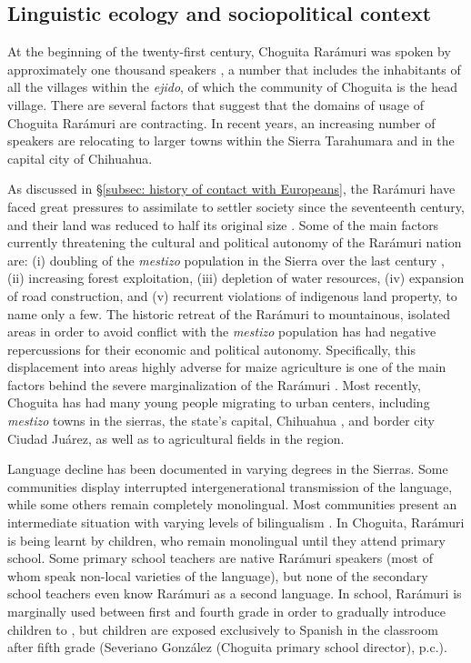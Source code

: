 \subsection{Linguistic ecology and sociopolitical context}
\label{subsec: linguistic ecology and socioolitical context}

At the beginning of the twenty-first century, Choguita Rarámuri was spoken by approximately one thousand speakers \citep{casaus2008quantitative}, a number that includes the inhabitants of all the villages within the \textit{ejido}, of which the community of Choguita is the head village. There are several factors that suggest that the domains of usage of Choguita Rarámuri are contracting. In recent years, an increasing number of speakers are relocating to larger towns within the Sierra Tarahumara and in the capital city of Chihuahua.

As discussed in §\ref{subsec: history of contact with Europeans}, the Rarámuri have faced great pressures to assimilate to settler society since the seventeenth century, and their land was reduced to half its original size \citep{paciotto1996tarahumara}. Some of the main factors currently threatening the cultural and political autonomy of the Rarámuri nation are: (i) doubling of the \textit{mestizo} population in the Sierra over the last century \citep{merrill2013genetic}, (ii) increasing forest exploitation, (iii) depletion of water resources, (iv) expansion of road construction, and (v) recurrent violations of indigenous land property, to name only a few. The historic retreat of the Rarámuri to mountainous, isolated areas in order to avoid conflict with the \textit{mestizo} population has had negative repercussions for their economic and political autonomy. Specifically, this displacement into areas highly adverse for maize agriculture is one of the main factors behind the severe marginalization of the Rarámuri \citep[][77]{merrill1988raramuri}. Most recently, Choguita has had many young people migrating to urban centers, including \textit{mestizo} towns in the sierras, the state’s capital, Chihuahua \citep{munoz2019reproduccion}, and border city Ciudad Juárez, as well as to agricultural fields in the region.

\hspace*{-.35pt}Language decline has been documented in varying degrees in the Sierras. Some communities display interrupted intergenerational transmission of the language, while some others remain completely monolingual. Most communities present an intermediate situation with varying levels of bilingualism \parencite{paciotto1996tarahumara}. In Choguita, Rarámuri is being learnt by children, who remain monolingual until they attend primary school. Some primary school teachers are native Rarámuri speakers (most of whom speak non-local varieties of the language), but none of the secondary school teachers even know Rarámuri as a second language. In school, Rarámuri is marginally used between first and fourth grade in order to gradually introduce children to , but children are exposed exclusively to {Spanish} in the classroom after fifth grade (Severiano González (Choguita primary school director), p.c.).

